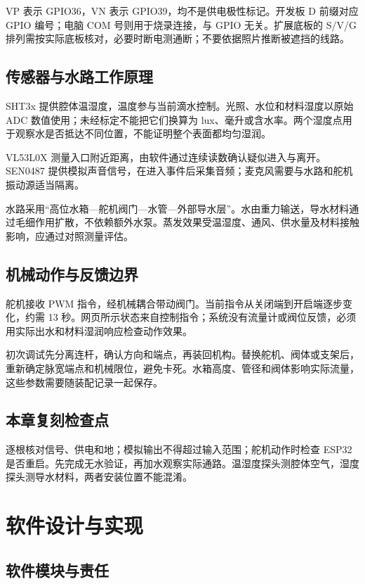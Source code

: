 \documentclass[10pt,a4paper]{article}
\begin{document}
VP 表示 GPIO36，VN 表示 GPIO39，均不是供电极性标记。开发板 D 前缀对应 GPIO 编号；电脑 COM 号则用于烧录连接，与 GPIO 无关。扩展底板的 S/V/G 排列需按实际底板核对，必要时断电测通断；不要依据照片推断被遮挡的线路。


\clearpage

\subsection{传感器与水路工作原理}

SHT3x 提供腔体温湿度，温度参与当前滴水控制。光照、水位和材料湿度以原始 ADC 数值使用；未经标定不能把它们换算为 lux、毫升或含水率。两个湿度点用于观察水是否抵达不同位置，不能证明整个表面都均匀湿润。


VL53L0X 测量入口附近距离，由软件通过连续读数确认疑似进入与离开。SEN0487 提供模拟声音信号，在进入事件后采集音频；麦克风需要与水路和舵机振动源适当隔离。


水路采用“高位水箱—舵机阀门—水管—外部导水层”。水由重力输送，导水材料通过毛细作用扩散，不依赖额外水泵。蒸发效果受温湿度、通风、供水量及材料接触影响，应通过对照测量评估。


\subsection{机械动作与反馈边界}

舵机接收 PWM 指令，经机械耦合带动阀门。当前指令从关闭端到开启端逐步变化，约需 13 秒。网页所示状态来自控制指令；系统没有流量计或阀位反馈，必须用实际出水和材料湿润响应检查动作效果。


初次调试先分离连杆，确认方向和端点，再装回机构。替换舵机、阀体或支架后，重新确定脉宽端点和机械限位，避免卡死。水箱高度、管径和阀体影响实际流量，这些参数需要随装配记录一起保存。


\subsection{本章复刻检查点}

逐根核对信号、供电和地；模拟输出不得超过输入范围；舵机动作时检查 ESP32 是否重启。先完成无水验证，再加水观察实际通路。温湿度探头测腔体空气，湿度探头测导水材料，两者安装位置不能混淆。


\clearpage
\section{软件设计与实现}

\subsection{软件模块与责任}
\end{document}
